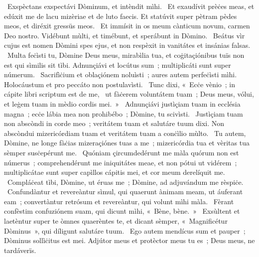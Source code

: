 ~Exspèctans exspectávi Dòminum, et intèndit mìhi. 
~Et exaudívit prèċes meas, et edúxit me de lacu mizèriae et de luto faecis. Et statúvit super pètram pèdes meos, et diréxit gressüs meos. 
~Et immísit in os meum cànticum novum, carmen Deo nostro. Vidébunt mùlti, et timébunt, et sperábunt in Dòmino. 
~Beátus vìr cujus est nomen Dòmini spes ejus, et non respèxit in vanitátes et insánias falsas. 
~Multa feċìsti tu, Dòmine Deus meus, mirabìlia tua, et coġitaçiónibus tuïs non est qui sìmilis sit tìbi. Adnunçiávi et locútus sum~; multiplicáti sunt super númerum. 
~Sacrifìċium et oblaçiónem noluìsti~; aures autem perfeċìsti mìhi. Holocáustum et pro peccáto non postulavìsti. 
~Tunc dixi, «~Ecċe vènio~; in cápite libri scriptum est de me, 
~ut fàċerem voluntátem tuam~; Deus meus, vólui, et leġem tuam in mèdio cordis mei.~»
~Adnunçiávi justìçiam tuam in ecclésia magna~; ecċe lábia mea non prohibébo~; Dòmine, tu scivìsti. 
~Justìçiam tuam non abscòndi in corde meo~; veritátem tuam et salutáre tuum dixi. Non abscòndui mizericórdiam tuam et veritátem tuam a conċìlio mùlto. 
~Tu autem, Dòmine, ne longe fàċias mizeraçiónes tuas a me~; mizericórdia tua et vèritas tua sèmper susċepérunt me. 
~Quóniam çircumdedérunt me màla quórum non est númerus~; comprehendérunt me iniquitátes meae, et non pótui ut vidérem~; multiplicátae sunt super capìllos cápitis mei, et cor meum derelíquit me. 
~Compláċeat tìbi, Dòmine, ut éruas me~; Dòmine, ad adjuvándum me rèspiċe. 
~Confundàntur et revereàntur sìmul, qui quaerunt ànimam meam, ut áuferant eam~; convertàntur retrósum et revereàntur, qui volunt mìhi màla. 
~Fèrant confèstim confuziónem suam, qui dicunt mìhi, «~Bène, bène.~»
~Exsùltent et laetèntur super te òmnes quaerèntes te, et dicant sèmper, «~Magnificétur Dòminus~», qui díligunt salutáre tuum. 
~Ego autem mendícus sum et pauper~; Dòminus sollìċitus est mei. Adjútor meus et protèctor meus tu es~; Deus meus, ne  tardáverïs. 
